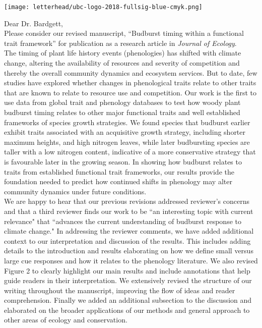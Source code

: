 \documentclass[11pt,a4paper]{article}
\begin{document}
\noindent \texttt{[image: letterhead/ubc-logo-2018-fullsig-blue-cmyk.png]}

\noindent Dear Dr. Bardgett,
\vspace{1.5ex}\\
\noindent Please consider our revised manuscript, ``Budburst timing within a functional trait framework'' for publication as a research article in \emph{Journal of Ecology}. 
\vspace{1.5ex}\\ 
\noindent The timing of plant life history events (phenologies) has shifted with climate change, altering the availability of resources and severity of competition and thereby the overall community dynamics and ecosystem services. But to date, few studies have explored whether changes in phenological traits relate to other traits that are known to relate to resource use and competition. Our work is the first to use data from global trait and phenology databases to test how woody plant budburst timing relates to other major functional traits and well established frameworks of species growth strategies. We found species that budburst earlier exhibit traits associated with an acquisitive growth strategy, including shorter maximum heights, and high nitrogen leaves, while later budbursting species are taller with a low nitrogen content, indicative of a more conservative strategy that is favourable later in the growing season. In showing how budburst relates to traits from established functional trait frameworks, our results provide the foundation needed to predict how continued shifts in phenology may alter community dynamics under future conditions. 
\vspace{1.5ex}\\ 
We are happy to hear that our previous revisions addressed reviewer's concerns and that a third reviewer finds our work to be ``an interesting topic with current relevance" that ``advances the current understanding of budburst response to climate change."  In addressing the reviewer comments, we have added additional context to our interpretation and discussion of the results. This includes adding details to the introduction and results elaborating on how we define small versus large cue responses and how it relates to the phenology literature. We also revised Figure 2 to clearly highlight our main results and include annotations that help guide readers in their interpretation. We extensively revised the structure of our writing throughout the manuscript, improving the flow of ideas and reader comprehension. Finally we added an additional subsection to the discussion and elaborated on the broader applications of our methods and general approach to other areas of ecology and conservation.
\end{document}
